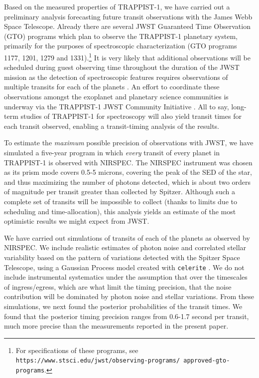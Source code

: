 \documentclass[twocolumn]{aastex63}
\begin{document}
Based on the measured properties of TRAPPIST-1, we have carried out a preliminary analysis forecasting future transit observations with the James Webb Space Telescope. Already there are several JWST Guaranteed Time Observation (GTO) programs which plan to observe the TRAPPIST-1 planetary system, primarily for the purposes of spectroscopic characterization (GTO programs 1177, 1201, 1279 and 1331).\footnote{For specifications of these programs, see \texttt{https://www.stsci.edu/jwst/observing-programs/ approved-gto-programs}.}  It is very likely that additional observations will be scheduled during guest observing  time throughout the duration of the JWST mission as the detection of spectroscopic features requires observations of multiple transits for each of the planets \citep{Morley2017,Barstow2016,Lustig-Yaeger2019,Fauchez2020b}.   An effort to coordinate these observations amongst the exoplanet and planetary science communities is underway via the TRAPPIST-1 JWST Community Initiative \citep{Gillon2020}.  All to say, long-term studies of TRAPPIST-1 for spectroscopy will also yield transit times for each transit observed, enabling a transit-timing analysis of the results.

To estimate the {\it maximum} possible precision of observations with JWST, we have simulated a five-year program in which {\it every} transit of every planet in TRAPPIST-1 is observed with NIRSPEC.   The NIRSPEC instrument was chosen as its prism mode covers 0.5-5 microns, covering the peak of the SED of the star, and thus maximizing the number of photons detected, which is about two orders of magnitude per transit greater than collected by Spitzer. Although such a complete set of transits will be impossible to collect (thanks to limits due to scheduling and time-allocation), this analysis yields an estimate of the most optimistic results we might expect from JWST.

We have carried out simulations of transits of each of the planets as observed by NIRSPEC.  We include realistic estimates of photon noise and correlated stellar variability based on the pattern of variations detected with the Spitzer Space Telescope, using a Gaussian Process model created with \texttt{celerite} \citep{ForemanMackey2017}.  We do not include instrumental systematics under the assumption that over the timescales of ingress/egress, which are what limit the timing precision, that the noise contribution will be dominated by photon noise and stellar variations.
From these simulations, we
next found the posterior probabilities of the transit times.   We found that the posterior timing precision ranges from 0.6-1.7 second per transit, much more precise than the measurements reported in the present paper.
\end{document}

